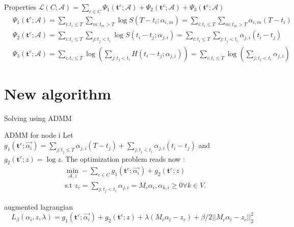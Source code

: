 \documentclass{beamer}
\begin{document}
\begin{frame}{Properties}
        $\mathscr{L}(C;\mathscr{A}) = \sum_{c \in C}\Psi_1(\textbf{t}^c;\mathscr{A})+\Psi_2(\textbf{t}^c;\mathscr{A})+\Psi_3(\textbf{t}^c;\mathscr{A})$
    \begin{equation}
        \begin{split}
        &\Psi_1(\textbf{t}^c;\mathscr{A}) = \sum_{i:t_i\leq T}\sum_{m : t_m>T} \log S(T-t_i;\alpha_{i,m}) = \sum_{i:t_i\leq T}\sum_{m : t_m>T} \alpha_{i,m}(T-t_i)\\
       &\Psi_2(\textbf{t}^c;\mathscr{A}) = \sum_{i:t_i\leq T}\sum_{j:t_j<t_i}\log S(t_i-t_j;\alpha_{j,i}) = \sum_{i:t_i\leq T}\sum_{j : t_j<t_i} \alpha_{j,i}(t_i-t_j)\\
        &\Psi_3(\textbf{t}^c;\mathscr{A}) = \sum_{i:t_i\leq T}\log(\sum_{j:t_j<t_i}H(t_i-t_j;\alpha_{j,i})) = \sum_{i:t_i\leq T}\log(\sum_{j:t_j<t_i}\alpha_{j,i}) 
        \end{split}
    \end{equation}
\end{frame}
\section{New algorithm}
\begin{frame}{Solving using ADMM}
    \begin{block}{ADMM for node i}
    Let $g_1(\textbf{t}^c;\Vec{\alpha_i}) = \sum_{j:t_j \leq T} \alpha_{j,i}(T-t_j) + \sum_{j : t_j<t_i} \alpha_{j,i}(t_i-t_j)$ and $g_2(\textbf{t}^c;z) = \log z $. The optimization problem reads now :
    \begin{equation}
        \begin{split}
            &\min_{\mathscr{A},z} -\sum_{c\in C}g_1(\textbf{t}^c;\Vec{\alpha_i}) +  g_2(\textbf{t}^c;z)\\
            &\text{s.t } z_c = \sum_{j:t_j<t_i}\alpha_{j,i} = M_c \alpha_i, \alpha_{k,i} \geq 0 \forall k\in V.
        \end{split}
    \end{equation}
    \end{block}
    \begin{block}{augmented lagrangian}
    \begin{equation}
        L_\beta(\alpha_i,z,\lambda) = g_1(\textbf{t}^c;\Vec{\alpha_i}) + g_2(\textbf{t}^c;z) + \lambda(M_c \alpha_i - z_c) + \beta/2||M_c\alpha_i -z_c||^2_2
    \end{equation}
    \end{block}
\end{frame}
\end{document}
